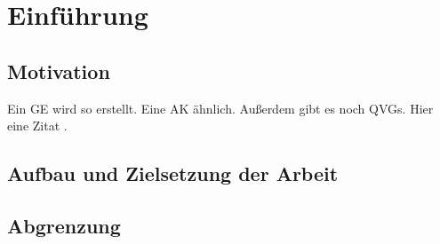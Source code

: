 \chapter{Einführung}
\section{Motivation}
Ein \gls{GE} wird so erstellt. Eine \gls{AK} ähnlich. Außerdem gibt es noch \glspl{QVG}. Hier eine Zitat \parencite[vgl.][S. 25]{Beispiel.2015}.
\section{Aufbau und Zielsetzung der Arbeit}

\section{Abgrenzung}
